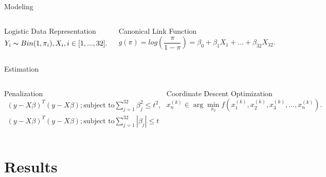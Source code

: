 \documentclass[12pt]{beamer}
\begin{document}
\begin{frame}{Modeling}
 \begin{columns}
 \begin{block}{Logistic Data Representation}
    \begin{equation}    %
            Y_i \thicksim Bin(1,\pi_i), X_i, i \in [1,...,32]. 
    \end{equation}
    \end{block}
    \begin{block}{Canonical Link Function}
    \begin{equation}    %
            g(\pi)=log(\frac{\pi}{1-\pi})=\beta_0+\beta_1X_1+...+\beta_{32}X_{32}.
    \end{equation}
\end{block}
\end{columns}
\end{frame}


\begin{frame}{Estimation}

 \begin{columns}
\begin{block}{Penalization}
    \begin{equation}    %
    \begin{aligned}
            (y-X\beta)^T(y-X\beta); \text{subject to} \sum_{j=1}^{32} \beta_j^2 \le t^2 ,\\
(y-X\beta)^T(y-X\beta); \text{subject to} \sum_{j=1}^{32} |\beta_j| \le t
     \end{aligned}
     \end{equation}
    \end{block}

    \begin{block}{Coordinate Descent Optimization}
    \begin{equation}    %
           x_n^{(k)} \in \arg\min_{x_2} f(x_1^{(k)},x_2^{(k)},x_3^{(k)},...,x_n^{(k)}).
    \end{equation}
\end{block}
\end{columns}
\end{frame}



\section{Results}
\end{document}
